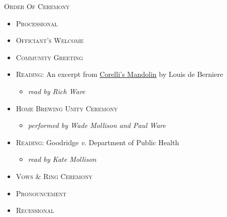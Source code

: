 \documentclass[12pt]{article}
\begin{document}
\begin{minipage}[t]{0.495\textwidth}
\centering

\textsc{Order Of Ceremony}

\begin{itemize}

\item [] \textsc{Processional}
\item [] \textsc{Officiant's Welcome}
\item [] \textsc{Community Greeting}
\item [] \textsc{Reading}: An excerpt from \underline{Corelli's Mandolin} by Louis de Berniere
\begin{itemize}[topsep=-5pt,itemsep=-1ex,partopsep=1ex,parsep=1ex]
\item [] \textit{read by Rich Ware}
\end{itemize}

\item [] \textsc{Home Brewing Unity Ceremony}
\begin{itemize}[topsep=-5pt,itemsep=-1ex,partopsep=1ex,parsep=1ex]
\item [] \textit{performed by Wade Mollison and Paul Ware}
\end{itemize}

\item [] \textsc{Reading}: Goodridge \textit{v.} Department of Public Health
\begin{itemize}[topsep=-5pt,itemsep=-1ex,partopsep=1ex,parsep=1ex]
\item [] \textit{read by Kate Mollison}

\end{itemize}

%
%

\item [] \textsc{Vows \& Ring Ceremony}
\item [] \textsc{Pronouncement}
\item [] \textsc{Recessional}
\end{itemize}

\end{minipage}
\end{document}
